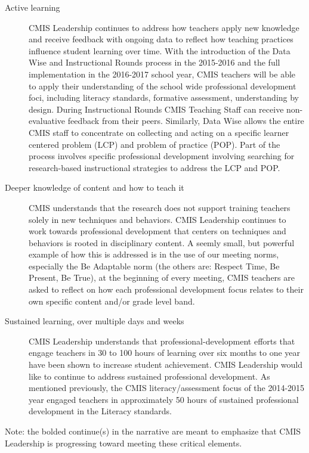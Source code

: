 \documentclass{report}
\begin{document}
\begin{findings}
\begin{description}
\item [Active learning] CMIS Leadership continues to address how teachers apply new knowledge and receive feedback with ongoing data to reflect how teaching practices influence student learning over time. With the introduction of the Data Wise and Instructional Rounds process in the 2015-2016 and the full implementation in the 2016-2017 school year, CMIS teachers will be able to apply their understanding of the school wide professional development foci, including literacy standards, formative assessment, understanding by design. During Instructional Rounds CMIS Teaching Staff can receive non-evaluative feedback from their peers. Similarly, Data Wise allows the entire CMIS staff to concentrate on collecting and acting on a  specific learner centered problem (LCP) and problem of practice (POP). Part of the process involves specific professional development involving searching for research-based instructional strategies to address the LCP and POP. 
\item [Deeper knowledge of content and how to teach it] CMIS understands that the research does not support training teachers solely in new techniques and behaviors. CMIS Leadership continues to work towards professional development that centers on techniques and behaviors is rooted in disciplinary content. A seemly small, but powerful example of how this is addressed is in the use of our meeting norms, especially the Be Adaptable norm (the others are: Respect Time, Be Present, Be True), at the beginning of every meeting, CMIS teachers are asked to reflect on how each professional development focus relates to their own specific content and/or grade level band. 
\item [Sustained learning, over multiple days and weeks] CMIS Leadership understands that professional-development efforts that engage teachers in 30 to 100 hours of learning over six months to one year have been shown to increase student achievement. CMIS Leadership would like to continue to address sustained professional development. As mentioned previously, the CMIS literacy/assessment focus of the 2014-2015 year engaged teachers in approximately 50 hours of sustained professional development in the Literacy standards. 
\end{description}

Note: the bolded continue(s) in the narrative are meant to emphasize that CMIS Leadership is progressing toward meeting these critical elements. 



\end{findings}
\end{document}
